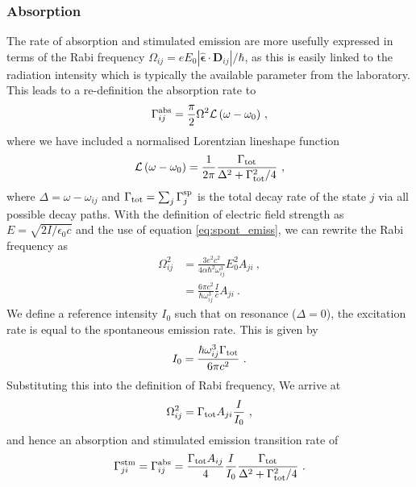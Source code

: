 \documentclass{article}
\begin{document}
\subsubsection{Absorption}
The rate of absorption and stimulated emission are more usefully expressed in terms of the Rabi frequency $\Omega_{ij} = e E_0\left|\boldsymbol{\hat{\epsilon}}\cdot\mathbf{D}_{ij}\right|/\hbar$, as this is easily linked to the radiation intensity which is typically the available parameter from the laboratory. This leads to a re-definition the absorption rate to  
\begin{equation}
     \Gamma^{\rm{abs}}_{ij} = \frac{\pi}{2}\Omega^2 {\mathcal{L}\left(\omega-\omega_0\right)}~,
\end{equation}
where we have included a normalised Lorentzian lineshape function 
\begin{equation}
     {\mathcal{L}\left(\omega-\omega_0\right)} = \frac{1}{2\pi}\frac{\Gamma_{\rm{tot}}}{\Delta^2 + \Gamma_{\rm{tot}}^2/4}~,
\end{equation}
where $\Delta = \omega - \omega_{ij}$ and $\Gamma_{\rm{tot}} = \sum_{j} \Gamma^{\rm{sp}}_{j}$ is the total decay rate of the state $j$ via all possible decay paths. With the definition of electric field strength as ${E=\sqrt{2I/\epsilon_0 c}}$ and the use of equation \ref{eq:spont_emiss}, we can rewrite the Rabi frequency as 
\begin{align}
    \Omega_{ij}^2 &= \frac{3 e^2c^2}{4\alpha \hbar^2\omega_{ij}^3}E_0^2A_{ji}~, \\ &= \frac{6\pi c^2}{\hbar\omega_{ij}^3} \frac{I}{c} A_{ji}~.
\end{align}
We define a reference intensity $I_0$ such that on resonance ($\Delta = 0$), the excitation rate is equal to the spontaneous emission rate. This is given by
\begin{equation}
    I_0 = \frac{\hbar \omega_{ij}^3 \Gamma_{\rm{tot}}}{6\pi c^2}~.
\end{equation}
Substituting this into the definition of Rabi frequency, We arrive at 
\begin{equation}
    \Omega_{ij}^2 = \Gamma_{\rm{tot}} A_{ji}\frac{I}{I_0}~,
\end{equation}
and hence an absorption and stimulated emission transition rate of
\begin{equation}
    \Gamma^{\rm{stm}}_{ji} = \Gamma^{\rm{abs}}_{ij} = \frac{\Gamma_{\rm{tot}} A_{ij}}{4} \frac{I}{I_0} \frac{\Gamma_{\rm{tot}}}{\Delta^2 + \Gamma_{\rm{tot}}^2/4}~.
\end{equation}
\end{document}
